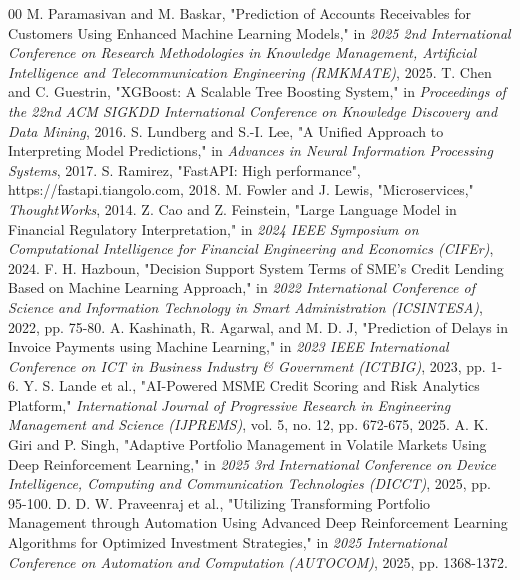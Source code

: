 \documentclass[conference]{IEEEtran}
\begin{document}
\begin{thebibliography}{00}
 M. Paramasivan and M. Baskar, "Prediction of Accounts Receivables for Customers Using Enhanced Machine Learning Models," in \textit{2025 2nd International Conference on Research Methodologies in Knowledge Management, Artificial Intelligence and Telecommunication Engineering (RMKMATE)}, 2025.
 T. Chen and C. Guestrin, "XGBoost: A Scalable Tree Boosting System," in \textit{Proceedings of the 22nd ACM SIGKDD International Conference on Knowledge Discovery and Data Mining}, 2016.
 S. Lundberg and S.-I. Lee, "A Unified Approach to Interpreting Model Predictions," in \textit{Advances in Neural Information Processing Systems}, 2017.
 S. Ramirez, "FastAPI: High performance", https://fastapi.tiangolo.com, 2018.
 M. Fowler and J. Lewis, "Microservices," \textit{ThoughtWorks}, 2014.
 Z. Cao and Z. Feinstein, "Large Language Model in Financial Regulatory Interpretation," in \textit{2024 IEEE Symposium on Computational Intelligence for Financial Engineering and Economics (CIFEr)}, 2024.
 F. H. Hazboun, "Decision Support System Terms of SME’s Credit Lending Based on Machine Learning Approach," in \textit{2022 International Conference of Science and Information Technology in Smart Administration (ICSINTESA)}, 2022, pp. 75-80.
 A. Kashinath, R. Agarwal, and M. D. J, "Prediction of Delays in Invoice Payments using Machine Learning," in \textit{2023 IEEE International Conference on ICT in Business Industry \& Government (ICTBIG)}, 2023, pp. 1-6.
 Y. S. Lande et al., "AI-Powered MSME Credit Scoring and Risk Analytics Platform," \textit{International Journal of Progressive Research in Engineering Management and Science (IJPREMS)}, vol. 5, no. 12, pp. 672-675, 2025.
 A. K. Giri and P. Singh, "Adaptive Portfolio Management in Volatile Markets Using Deep Reinforcement Learning," in \textit{2025 3rd International Conference on Device Intelligence, Computing and Communication Technologies (DICCT)}, 2025, pp. 95-100.
 D. D. W. Praveenraj et al., "Utilizing Transforming Portfolio Management through Automation Using Advanced Deep Reinforcement Learning Algorithms for Optimized Investment Strategies," in \textit{2025 International Conference on Automation and Computation (AUTOCOM)}, 2025, pp. 1368-1372.
\end{thebibliography}
\end{document}

